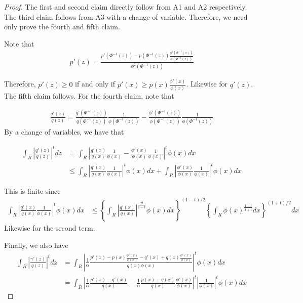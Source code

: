 \begin{proof}

The first and second claim directly follow from A1 and A2 respectively. The third claim follows from A3 with a change of variable. Therefore, we need only prove the fourth and fifth claim. 

Note that 
\begin{align*}
p'(z) = \frac{ p'(\Phi^{-1}(z))  - 
                     p(\Phi^{-1}(z)) \frac{\phi'(\Phi^{-1}(z))}{\phi(\Phi^{-1}(z))} }
           { \phi^2(\Phi^{-1}(z))}
\end{align*}

Therefore, $p'(z) \geq 0$ if and only if $p'(x) \geq p(x) \frac{\phi'(x)}{\phi(x)}$. Likewise for $q'(z)$. The fifth claim follows.
For the fourth claim, note that 

\begin{align*}
\frac{q'(z)}{q(z)} = \frac{ q'(\Phi^{-1}(z)) }{q(\Phi^{-1}(z))} \frac{1}{ \phi(\Phi^{-1}(z))} - 
                     \frac{ \phi'(\Phi^{-1}(z)) }{\phi(\Phi^{-1}(z))} \frac{1}{ \phi(\Phi^{-1}(z))} 
\end{align*}
By a change of variables, we have that

\begin{align*}
\int_R \left| \frac{q'(z)}{q(z)} \right|^t dz 
          &= \int_R \left| \frac{ q'(x) }{q(x)} \frac{1}{ \phi(x)} - 
                     \frac{ \phi'(x) }{\phi(x)} \frac{1}{ \phi(x)} \right|^t \phi(x) dx \\
   &\leq  \int_R \left| \frac{ q'(x) }{q(x)} \frac{1}{ \phi(x)} \right|^t \phi(x) dx + 
         \int_R  \left| \frac{ \phi'(x) }{\phi(x)} \frac{1}{ \phi(x)} \right|^t \phi(x) dx 
\end{align*}

This is finite since 
\begin{align*}
 \int_R \left| \frac{ q'(x) }{q(x)} \frac{1}{ \phi(x)} \right|^t \phi(x) dx &\leq 
       \left\{ \int_R \left| \frac{ q'(x) }{q(x)} \right|^{\frac{2t}{1-t}} \phi(x) dx \right \}^{(1-t)/2}
       \left\{ \int_R \phi(x)^{\frac{1-t}{1+t}} dx \right\}^{(1+t)/2} dx
\end{align*}
Likewise for the second term.

Finally, we also have
\begin{align*}
 \int_R \left| \frac{\gamma'(z)}{q(z)} \right|^t dz &= 
    \int_R \left| \frac{1}{\alpha} \frac{p'(x) - p(x) \frac{\phi'(x)}{\phi(x)} - q'(x) + q(x) \frac{\phi'(x)}{\phi(x)} }
                                       {q(x) \phi(x) } \right|^t \phi(x) dx \\
  &= \int_R \left| \frac{1}{\alpha} \frac{p'(x) - q'(x)}{q(x)} 
                       - \frac{1}{\alpha} \frac{p(x) - q(x)}{q(x)} \frac{\phi'(x)}{\phi(x)}\right|^t \left| \frac{1}{\phi(x)} \right|^t \phi(x) dx 
\end{align*}


\end{proof}
